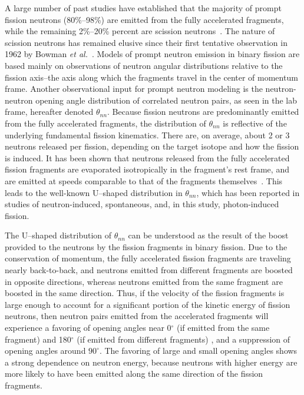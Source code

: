 A large number of past studies have established that the majority of prompt fission neutrons (80\%--98\%) are emitted from the fully accelerated fragments, while the remaining 2\%--20\% percent are scission neutrons~\cite{Scission2005}.
The nature of scission neutrons has remained elusive since their first tentative observation in 1962 by Bowman \emph{et al.}~\cite{Bowman}.
Models of prompt neutron emission in binary fission are based mainly on observations of neutron angular distributions relative to the fission axis--the axis along which the fragments travel in the center of momentum frame.
Another observational input for prompt neutron modeling is the neutron-neutron opening angle distribution of correlated neutron pairs, as seen in the lab frame, hereafter denoted $\theta_{nn}$.
Because fission neutrons are predominantly emitted from the fully accelerated fragments, the distribution of $\theta_{nn}$ is reflective of the underlying fundamental fission kinematics.
There are, on average, about 2 or 3 neutrons released per fission, depending on the target isotope and how the fission is induced.
It has been shown that neutrons released from the fully accelerated fission fragments are evaporated isotropically in the fragment's rest frame, and are emitted at speeds comparable to that of the fragments themselves~\cite{JORGENSEN}.
This leads to the well-known U--shaped distribution in $\theta_{nn}$, which has been reported in studies of neutron-induced, spontaneous, and, in this study, photon-induced fission.

The U--shaped distribution of $\theta_{nn}$ can be understood as the result of the boost provided to the neutrons by the fission fragments in binary fission.
Due to the conservation of momentum, the fully accelerated fission fragments are traveling nearly back-to-back, and neutrons emitted from different fragments are boosted in opposite directions, whereas neutrons emitted from the same fragment are boosted in the same direction.
Thus, if the velocity of the fission fragments is large enough to account for a significant portion of the kinetic energy of fission neutrons, then neutron pairs emitted from the accelerated fragments will experience a favoring of opening angles near 0$^{\circ}$ (if emitted from the same fragment) and 180$^{\circ}$ (if emitted from different fragments) , and a suppression of opening angles around $90^{\circ}$.
The favoring of large and small opening angles shows a strong dependence on neutron energy, because neutrons with higher energy are more likely to have been emitted along the same direction of the fission fragments.

